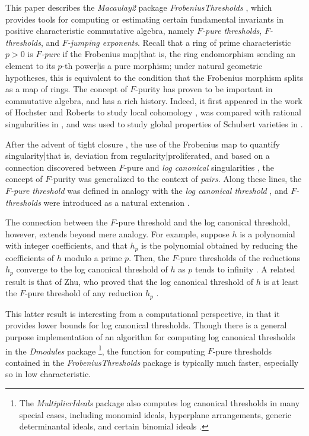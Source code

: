 \documentclass{amsart}
\begin{document}
This paper describes the \emph{Macaulay2} package \emph{FrobeniusThresholds} \cite{M2, FThresholdsPackage}, which provides tools for computing or estimating certain fundamental invariants in positive characteristic commutative algebra, namely \emph{$F$-pure thresholds}, \emph{$F$-thresholds}, and \emph{$F$-jumping exponents}.
Recall that a ring of prime characteristic $p>0$ is \emph{$F$-pure} if the Frobenius map|that is, the ring endomorphism sending an element to its $p$-th power|is a pure morphism;  under natural geometric hypotheses, this is equivalent to the condition that the Frobenius morphism splits as a map of rings.
The concept of $F$-purity has proven to be important in commutative algebra, and has a rich history.
Indeed, it first appeared in the work of Hochster and Roberts to study local cohomology \cite{HochsterRobertsFrobeniusLocalCohomology}, was compared with rational singularities in  \cite{FedderFPureRat}, and was used to study global properties of Schubert varieties in \cite{MehtaRamanathanFrobeniusSplittingAndCohomologyVanishing}.

After the advent of tight closure \cite{HochsterHunekeTC1}, the use of the Frobenius map to quantify singularity|that is, deviation from regularity|proliferated, and based on a connection discovered between $F$-pure and \emph{log canonical} singularities \cite{HaraWatanabeFRegFPure}, the concept of $F$-purity was generalized to the context of \emph{pairs}.
Along these lines, the \emph{$F$-pure threshold} was defined in analogy with the \emph{log canonical threshold} \cite{TakagiWatanabeFPureThresh}, and \emph{$F$-thresholds} were introduced as a natural extension \cite{MustataTakagiWatanabeFThresholdsAndBernsteinSato}.

The connection between the $F$-pure threshold and the log canonical threshold, however, extends beyond mere analogy.
For example, suppose $h$ is a polynomial with integer coefficients, and that $h_p$ is the polynomial obtained by reducing the coefficients of $h$ modulo a prime $p$.  Then, the $F$-pure thresholds of the reductions $h_p$ converge to the log canonical threshold of $h$ as $p$ tends to infinity \cite{HaraYoshidaGeneralizationOfTightClosure}.
A related result is that of Zhu, who proved that the log canonical threshold of $h$ is at least the $F$-pure threshold of any reduction $h_p$ \cite[Corollary 4.2]{ZhuLogCanoincalThresholdsInPositiveChar}.

This latter result is interesting from a computational perspective, in that it provides lower bounds for log canonical thresholds.
Though there is a general purpose implementation of an algorithm for computing log canonical thresholds in the \emph{Dmodules} package \cite{DmodulesSource}\footnote{The  \emph{MultiplierIdeals}  package also computes log canonical thresholds in many special cases, including monomial ideals, hyperplane arrangements, generic determinantal ideals, and certain binomial ideals \cite{MultiplierIdealsPackage, MultiplierIdealsArticle}.
}, the function for computing $F$-pure thresholds contained in the \emph{FrobeniusThresholds} package is typically much faster, especially so in low characteristic.
\end{document}
